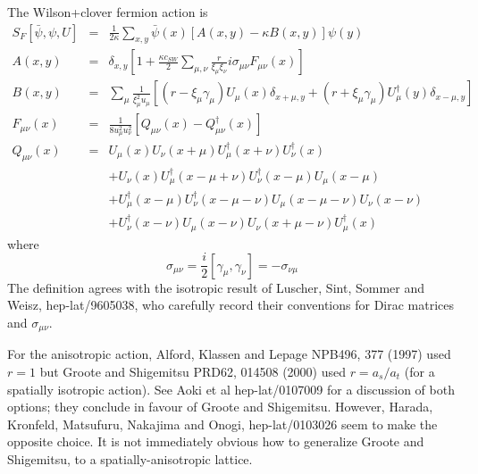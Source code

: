 \documentclass[12pt]{article}
\begin{document}
The Wilson+clover fermion action is
\begin{eqnarray}
S_F[\bar\psi,\psi,U] &=& \frac{1}{2\kappa}\sum_{x,y}\bar\psi(x)
                         \left[A(x,y)-\kappa B(x,y)\right]\psi(y) \nonumber \\
A(x,y) &=& \delta_{x,y}\left[1+\frac{\kappa c_{SW}}{2}\sum_{\mu,\nu}
           \frac{r}{\xi_\mu\xi_\nu}i\sigma_{\mu\nu}F_{\mu\nu}(x)\right]
           \nonumber \\
B(x,y) &=& \sum_\mu\frac{1}{\xi_\mu^2u_\mu}\left[(r-\xi_\mu\gamma_\mu)
           U_\mu(x)\delta_{x+\mu,y}
           +(r+\xi_\mu\gamma_\mu)U_\mu^\dagger(y)\delta_{x-\mu,y}\right]
           \nonumber \\
F_{\mu\nu}(x) &=& \frac{1}{8u_\mu^2u_\nu^2}[Q_{\mu\nu}(x)-Q_{\mu\nu}^\dagger
           (x)] \nonumber\\
Q_{\mu\nu}(x) &=&
  U_\mu(x)U_\nu(x+\mu)U_\mu^\dagger(x+\nu)U_\nu^\dagger(x) \nonumber \\
&&+U_\nu(x)U_\mu^\dagger(x-\mu+\nu)U_\nu^\dagger(x-\mu)U_\mu(x-\mu) \nonumber \\
&&+U_\mu^\dagger(x-\mu)U_\nu^\dagger(x-\mu-\nu)U_\mu(x-\mu-\nu)U_\nu(x-\nu)
  \nonumber \\
&&+U_\nu^\dagger(x-\nu)U_\mu(x-\nu)U_\nu(x+\mu-\nu)U_\mu^\dagger(x) \nonumber
\end{eqnarray}
where
\[
\sigma_{\mu\nu} = \frac{i}{2}[\gamma_\mu,\gamma_\nu] = -\sigma_{\nu\mu}
\]
The definition agrees with the isotropic result of
Luscher, Sint, Sommer and Weisz, hep-lat/9605038,
who carefully record their conventions for Dirac matrices and
$\sigma_{\mu\nu}$.

For the anisotropic action, Alford, Klassen and Lepage NPB496, 377 (1997)
used $r=1$ but Groote and Shigemitsu PRD62, 014508 (2000) used
$r=a_s/a_t$ (for a spatially isotropic action).  See Aoki et al hep-lat/0107009
for a discussion of both options; they conclude in favour of Groote and
Shigemitsu.  However, Harada, Kronfeld, Matsufuru, Nakajima and Onogi,
hep-lat/0103026 seem to make the opposite choice.
It is not immediately obvious how to generalize Groote and Shigemitsu, to
a spatially-anisotropic lattice.
\end{document}
